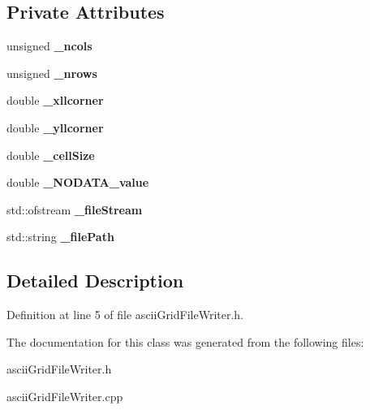 \subsection*{Private Attributes}
\begin{DoxyCompactItemize}
\item 
\mbox{\label{classasciiGridFileWriter_a57fcacc26c1f54f0bd90cacdb61bddba}} 
unsigned {\bfseries \+\_\+ncols}
\item 
\mbox{\label{classasciiGridFileWriter_a7eb307168908d3c54d1b4fd46d5edb37}} 
unsigned {\bfseries \+\_\+nrows}
\item 
\mbox{\label{classasciiGridFileWriter_a8f53a9796356585200cc121eb7d4a299}} 
double {\bfseries \+\_\+xllcorner}
\item 
\mbox{\label{classasciiGridFileWriter_ad066c235a53a1e2ec52cc6342bd95927}} 
double {\bfseries \+\_\+yllcorner}
\item 
\mbox{\label{classasciiGridFileWriter_a6ad00d11e5a9bd91d70e905ecf267f67}} 
double {\bfseries \+\_\+cell\+Size}
\item 
\mbox{\label{classasciiGridFileWriter_a218b0e5dfaea479b65366e5031267f6f}} 
double {\bfseries \+\_\+\+N\+O\+D\+A\+T\+A\+\_\+value}
\item 
\mbox{\label{classasciiGridFileWriter_a9aa51246fc6a5d3bb1a92474ae549aeb}} 
std\+::ofstream {\bfseries \+\_\+file\+Stream}
\item 
\mbox{\label{classasciiGridFileWriter_ad82a8e040c9810ea1bf0b3abfc89689d}} 
std\+::string {\bfseries \+\_\+file\+Path}
\end{DoxyCompactItemize}


\subsection{Detailed Description}


Definition at line 5 of file ascii\+Grid\+File\+Writer.\+h.



The documentation for this class was generated from the following files\+:\begin{DoxyCompactItemize}
\item 
ascii\+Grid\+File\+Writer.\+h\item 
ascii\+Grid\+File\+Writer.\+cpp\end{DoxyCompactItemize}
